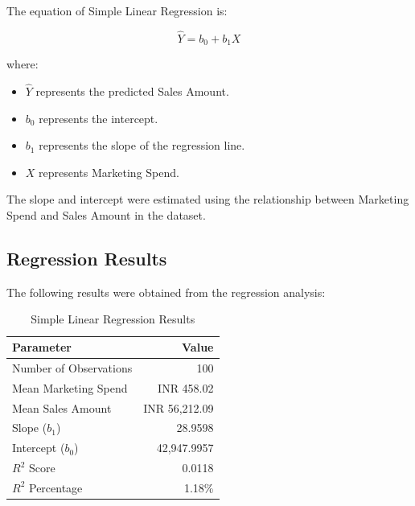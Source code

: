 \documentclass[12pt,a4paper]{report}
\begin{document}
The equation of Simple Linear
Regression is:

\[
\hat{Y} = b_0 + b_1X
\]

where:

\begin{itemize}

    \item $\hat{Y}$ represents the
    predicted Sales Amount.

    \item $b_0$ represents the intercept.

    \item $b_1$ represents the slope
    of the regression line.

    \item $X$ represents Marketing Spend.

\end{itemize}

The slope and intercept were estimated
using the relationship between
Marketing Spend and Sales Amount
in the dataset.


\subsection{Regression Results}

The following results were obtained
from the regression analysis:

\begin{table}[H]
\centering
\renewcommand{\arraystretch}{1.4}

\begin{tabular}{|l|r|}
\hline
\textbf{Parameter} & \textbf{Value} \\
\hline
Number of Observations & 100 \\
\hline
Mean Marketing Spend & INR 458.02 \\
\hline
Mean Sales Amount & INR 56,212.09 \\
\hline
Slope ($b_1$) & 28.9598 \\
\hline
Intercept ($b_0$) & 42,947.9957 \\
\hline
$R^2$ Score & 0.0118 \\
\hline
$R^2$ Percentage & 1.18\% \\
\hline
\end{tabular}

\caption{Simple Linear Regression Results}
\label{tab:linear_regression}

\end{table}
\end{document}
